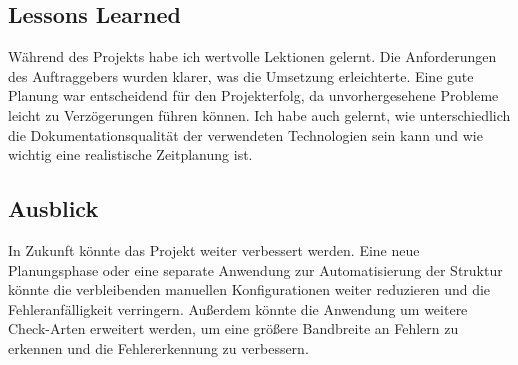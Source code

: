 \subsection{Lessons Learned}
Während des Projekts habe ich wertvolle Lektionen gelernt.
Die Anforderungen des Auftraggebers wurden klarer, was die Umsetzung erleichterte.
Eine gute Planung war entscheidend für den Projekterfolg, da unvorhergesehene Probleme leicht zu Verzögerungen führen können.
Ich habe auch gelernt, wie unterschiedlich die Dokumentationsqualität der verwendeten Technologien sein kann und wie wichtig eine realistische Zeitplanung ist.

\subsection{Ausblick}
In Zukunft könnte das Projekt weiter verbessert werden.
Eine neue Planungsphase oder eine separate Anwendung zur Automatisierung der Struktur könnte die verbleibenden manuellen Konfigurationen weiter reduzieren und die Fehleranfälligkeit verringern.
Außerdem könnte die Anwendung um weitere Check-Arten erweitert werden, um eine größere Bandbreite an Fehlern zu erkennen und die Fehlererkennung zu verbessern.
